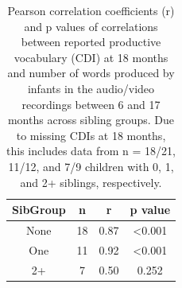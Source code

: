\documentclass[
  man,mask,floatsintext]{apa6}
\begin{document}
\begin{longtable}[t]{cccc}
\caption{\label{tab:production-corrs}Pearson correlation coefficients (r) and p values of correlations between reported productive vocabulary (CDI) at 18 months and number of words produced by infants in the audio/video recordings between 6 and 17 months across sibling groups. Due to missing CDIs at 18 months, this includes data from n = 18/21, 11/12, and 7/9 children with 0, 1, and 2+ siblings, respectively.}\\
\toprule
SibGroup & n & r & p value\\
\midrule
None & 18 & 0.87 & <0.001\\
One & 11 & 0.92 & <0.001\\
2+ & 7 & 0.50 & 0.252\\
\bottomrule
\end{longtable}
\end{document}
